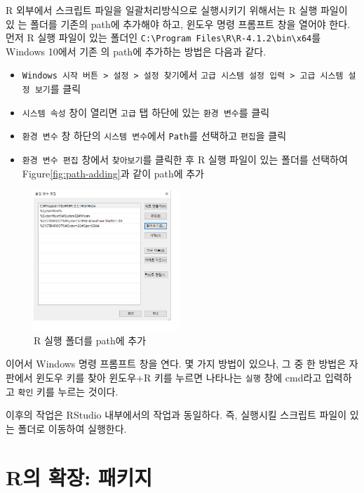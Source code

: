 \documentclass[
]{book}
\begin{document}
R 외부에서 스크립트 파일을 일괄처리방식으로 실행시키기 위해서는 R 실행
파일이 있 는 폴더를 기존의 path에 추가해야 하고, 윈도우 명령 프롬프트
창을 열어야 한다. 먼저 R 실행 파일이 있는 폴더인
\texttt{C:\textbackslash{}Program\ Files\textbackslash{}R\textbackslash{}R-4.1.2\textbackslash{}bin\textbackslash{}x64}를 Windows 10에서 기존 의 path에
추가하는 방법은 다음과 같다.

\begin{itemize}
\item
  \texttt{Windows\ 시작\ 버튼\ \textgreater{}\ 설정\ \textgreater{}\ 설정\ 찾기}에서
  \texttt{고급\ 시스템\ 설정\ 입력\ \textgreater{}\ \textquotesingle{}고급\ 시스템\ 설정\ 보기}를 클릭
\item
  \texttt{시스템\ 속성} 창이 열리면 \texttt{고급} 탭 하단에 있는 \texttt{환경\ 변수}를 클릭
\item
  \texttt{환경\ 변수} 창 하단의 \texttt{시스템\ 변수}에서 \texttt{Path}를 선택하고 \texttt{편집}을
  클릭
\item
  \texttt{환경\ 변수\ 편집} 창에서 \texttt{찾아보기}를 클릭한 후 R 실행 파일이 있는
  폴더를 선택하여 Figure\ref{fig:path-adding}과 같이 path에 추가
\end{itemize}

\begin{figure}
\hypertarget{path-adding}{%
\centering
\includegraphics[width=2.16667in,height=\textheight]{Figure/path_adding.png}
\caption{R 실행 폴더를 path에
추가}\label{path-adding}
}
\end{figure}

이어서 Windows 명령 프롬프트 창을 연다. 몇 가지 방법이 있으나, 그 중 한
방법은 자 판에서 윈도우 키를 찾아 윈도우+R 키를 누르면 나타나는 \texttt{실행}
창에 cmd라고 입력하고 \texttt{확인} 키를 누르는 것이다.

이후의 작업은 RStudio 내부에서의 작업과 동일하다. 즉, 실행시킬 스크립트
파일이 있 는 폴더로 이동하여 실행한다.

\hypertarget{section-package}{%
\section{R의 확장: 패키지}\label{section-package}}
\end{document}
